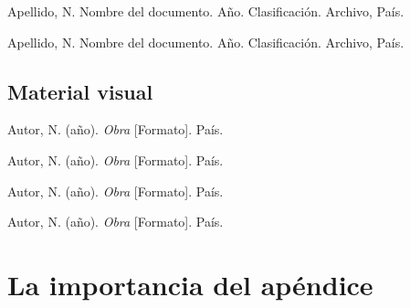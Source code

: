 \documentclass[12pt,letterpaper,oneside]{report}
\begin{document}
Apellido, N. Nombre del documento. Año. Clasificación. Archivo, País.

Apellido, N. Nombre del documento. Año. Clasificación. Archivo, País.

\section*{Material visual}

Autor, N. (año). \emph{Obra} [Formato]. País.

Autor, N. (año). \emph{Obra} [Formato]. País.

Autor, N. (año). \emph{Obra} [Formato]. País.

Autor, N. (año). \emph{Obra} [Formato]. País.



\appendix

\chapter{La importancia del apéndice}

\lipsum[1-10]
\end{document}
